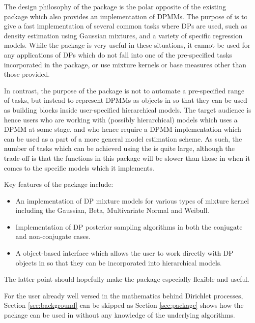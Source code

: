 \documentclass[nojss]{jss}
\begin{document}
The design philosophy of the  package is the polar opposite of the existing    package which also provides an implementation of DPMMs. The purpose of  is to give a fast implementation of several common tasks where DPs are used, such as density estimation using Gaussian mixtures, and a variety of specific regression models. While the  package is very useful in these situations, it cannot be used for any applications of DPs which do not fall into one of the pre-specified tasks incorporated in the package, or use mixture kernels or base measures other than those provided.

In contrast, the purpose of the  package is not to automate a pre-specified range of tasks, but instead to represent DPMMs as objects in  so that they can be used as building blocks inside user-specified hierarchical models. The target audience is hence users who are working with  (possibly hierarchical) models which uses a DPMM at some stage, and who hence require a DPMM implementation which can be used as a part of a more general model estimation scheme.  As such, the number of tasks which can be achieved using the  is quite large, although the trade-off is that the functions in this package will be slower than those in  when it comes to the specific models which it implements.

Key features of the  package include:
\begin{itemize}
\item An implementation of DP mixture models for various types of mixture kernel including the Gaussian, Beta, Multivariate Normal and Weibull.
\item Implementation of DP posterior sampling algorithms in both the conjugate and non-conjugate cases.
\item A object-based interface which allows the user to work directly with DP objects in  so that they can be incorporated into hierarchical models.
\end{itemize}
The latter point should hopefully make the package especially flexible and useful.

For the user already well versed in the mathematics behind Dirichlet processes, Section \ref{sec:background} can be skipped as Section \ref{sec:package} shows how the package can be used in  without any knowledge of the underlying algorithms.
\end{document}
